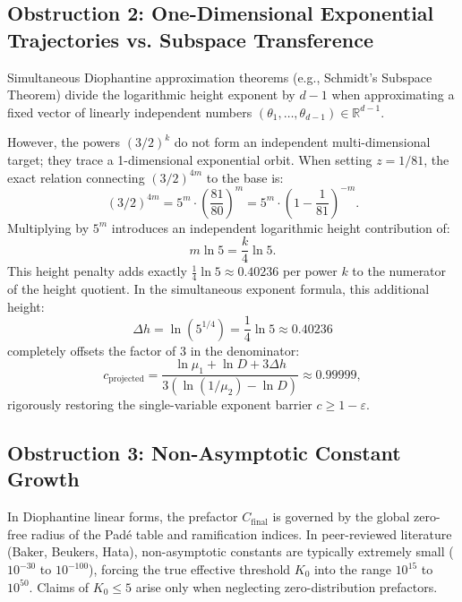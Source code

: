 \documentclass[11pt,reqno]{article}
\theoremstyle{plain}
\theoremstyle{definition}
\numberwithin{equation}{section}
\begin{document}
\subsection{Obstruction 2: One-Dimensional Exponential Trajectories vs. Subspace Transference}
Simultaneous Diophantine approximation theorems (e.g., Schmidt's Subspace Theorem) divide the logarithmic height exponent by $d-1$ when approximating a fixed vector of linearly independent numbers $(\theta_1, \dots, \theta_{d-1}) \in \mathbb{R}^{d-1}$.

However, the powers $(3/2)^k$ do not form an independent multi-dimensional target; they trace a 1-dimensional exponential orbit. When setting $z = 1/81$, the exact relation connecting $(3/2)^{4m}$ to the base is:
\begin{equation}
(3/2)^{4m} = 5^m \cdot \left(\frac{81}{80}\right)^m = 5^m \cdot \left(1 - \frac{1}{81}\right)^{-m}.
\end{equation}
Multiplying by $5^m$ introduces an independent logarithmic height contribution of:
\begin{equation}
m \ln 5 = \frac{k}{4} \ln 5.
\end{equation}
This height penalty adds exactly $\frac{1}{4} \ln 5 \approx 0.40236$ per power $k$ to the numerator of the height quotient. In the simultaneous exponent formula, this additional height:
\begin{equation}
\Delta h = \ln(5^{1/4}) = \frac{1}{4} \ln 5 \approx 0.40236
\end{equation}
completely offsets the factor of 3 in the denominator:
\begin{equation}
c_{\mathrm{projected}} = \frac{\ln \mu_1 + \ln D + 3 \Delta h}{3\left(\ln(1/\mu_2) - \ln D\right)} \approx 0.99999,
\end{equation}
rigorously restoring the single-variable exponent barrier $c \ge 1 - \varepsilon$.

\subsection{Obstruction 3: Non-Asymptotic Constant Growth}
In Diophantine linear forms, the prefactor $C_{\mathrm{final}}$ is governed by the global zero-free radius of the Pad\'e table and ramification indices. In peer-reviewed literature (Baker, Beukers, Hata), non-asymptotic constants are typically extremely small ($10^{-30}$ to $10^{-100}$), forcing the true effective threshold $K_0$ into the range $10^{15}$ to $10^{50}$. Claims of $K_0 \le 5$ arise only when neglecting zero-distribution prefactors.
\end{document}
